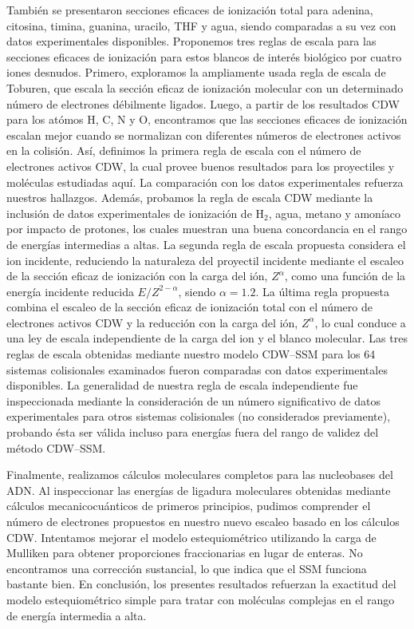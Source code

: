 También se presentaron secciones eficaces de ionización total para 
adenina, citosina, timina, guanina, uracilo, THF y agua, siendo 
comparadas a su vez con datos experimentales disponibles. Proponemos 
tres reglas de escala para las secciones eficaces de ionización para 
estos blancos de interés biológico por cuatro iones desnudos. Primero,
exploramos la ampliamente usada regla de escala de Toburen, que escala 
la sección eficaz de ionización molecular con un determinado número de 
electrones débilmente ligados. Luego, a partir de los resultados CDW para 
los atómos H, C, N y O, encontramos que las secciones eficaces de 
ionización escalan mejor cuando se normalizan con diferentes números de 
electrones activos en la colisión. Así, definimos la primera regla de 
escala con el número de electrones activos CDW, la cual provee buenos 
resultados para los proyectiles y moléculas estudiadas aquí. La 
comparación con los datos experimentales refuerza nuestros hallazgos. 
Además, probamos la regla de escala CDW mediante la inclusión de datos 
experimentales de ionización de H$_2$, agua, metano y amoníaco por 
impacto de protones, los cuales muestran una buena concordancia en el 
rango de energías intermedias a altas.
La segunda regla de escala propuesta considera el ion incidente, 
reduciendo la naturaleza del proyectil incidente mediante el escaleo de 
la sección eficaz de ionización con la carga del ión, $Z^{\alpha}$, como
una función de la energía incidente reducida $E/Z^{2-\alpha}$, siendo 
$\alpha=1.2$. La última regla propuesta combina el escaleo de la sección 
eficaz de ionización total con el número de electrones activos CDW y la
reducción con la carga del ión, $Z^{\alpha}$, lo cual conduce a una ley
de escala independiente de la carga del ion y el blanco molecular. Las
tres reglas de escala obtenidas mediante nuestro modelo CDW--SSM para los 
64 sistemas colisionales examinados fueron comparadas con datos 
experimentales disponibles. La generalidad de nuestra regla de escala
independiente fue inspeccionada mediante la consideración de un número 
significativo de datos experimentales para otros sistemas colisionales 
(no considerados previamente), probando ésta ser válida incluso para 
energías fuera del rango de validez del método CDW--SSM.

Finalmente, realizamos cálculos moleculares completos para las 
nucleobases del ADN. Al inspeccionar las energías de ligadura 
moleculares obtenidas mediante cálculos mecanicocuánticos de primeros 
principios, pudimos comprender el número de electrones propuestos en 
nuestro nuevo escaleo basado en los cálculos CDW. Intentamos mejorar el 
modelo estequiométrico utilizando la carga de Mulliken para obtener 
proporciones fraccionarias en lugar de enteras. No encontramos una 
corrección sustancial, lo que indica que el SSM funciona bastante bien. 
En conclusión, los presentes resultados refuerzan la exactitud del modelo
estequiométrico simple para tratar con moléculas complejas en el rango 
de energía intermedia a alta. 

